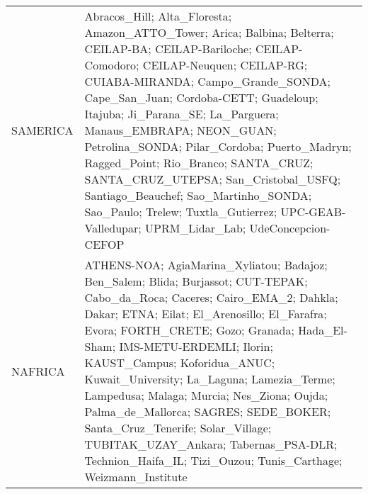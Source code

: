 \begin{table}
\begin{tabularx}{\textwidth}{lX}
  SAMERICA  & Abracos\_Hill; Alta\_Floresta; Amazon\_ATTO\_Tower; Arica; Balbina; Belterra; CEILAP-BA; CEILAP-Bariloche; CEILAP-Comodoro; CEILAP-Neuquen; CEILAP-RG; CUIABA-MIRANDA; Campo\_Grande\_SONDA; Cape\_San\_Juan; Cordoba-CETT; Guadeloup; Itajuba; Ji\_Parana\_SE; La\_Parguera; Manaus\_EMBRAPA; NEON\_GUAN; Petrolina\_SONDA; Pilar\_Cordoba; Puerto\_Madryn; Ragged\_Point; Rio\_Branco; SANTA\_CRUZ; SANTA\_CRUZ\_UTEPSA; San\_Cristobal\_USFQ; Santiago\_Beauchef; Sao\_Martinho\_SONDA; Sao\_Paulo; Trelew; Tuxtla\_Gutierrez; UPC-GEAB-Valledupar; UPRM\_Lidar\_Lab; UdeConcepcion-CEFOP                                                                                                                                                                                                                                                                                                                                                                                                                                                                                                                                                                                                                                                                                                                                                                                                                                                                                                                                                            \\
  NAFRICA   & ATHENS-NOA; AgiaMarina\_Xyliatou; Badajoz; Ben\_Salem; Blida; Burjassot; CUT-TEPAK; Cabo\_da\_Roca; Caceres; Cairo\_EMA\_2; Dahkla; Dakar; ETNA; Eilat; El\_Arenosillo; El\_Farafra; Evora; FORTH\_CRETE; Gozo; Granada; Hada\_El-Sham; IMS-METU-ERDEMLI; Ilorin; KAUST\_Campus; Koforidua\_ANUC; Kuwait\_University; La\_Laguna; Lamezia\_Terme; Lampedusa; Malaga; Murcia; Nes\_Ziona; Oujda; Palma\_de\_Mallorca; SAGRES; SEDE\_BOKER; Santa\_Cruz\_Tenerife; Solar\_Village; TUBITAK\_UZAY\_Ankara; Tabernas\_PSA-DLR; Technion\_Haifa\_IL; Tizi\_Ouzou; Tunis\_Carthage; Weizmann\_Institute                                                                                                                                                                                                                                                                                                                                                                                                                                                                                                                                                                                                                                                                                                                                                                                                                                                                                                                                                       \\

\end{tabularx}
\end{table}
